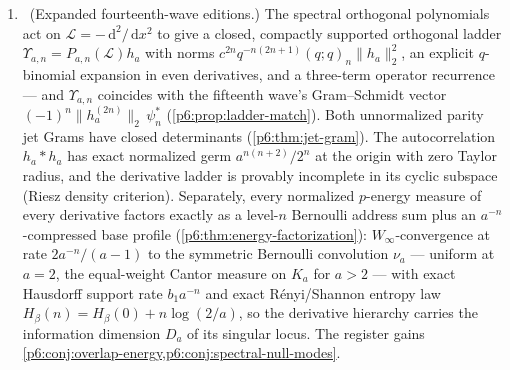 \documentclass[11pt,oneside]{article}
\numberwithin{equation}{section}
\theoremstyle{definition}
\theoremstyle{remark}
\newcommand{\dd}{\,\mathrm d}
\begin{document}
\begin{enumerate}
\item \newflag\ (Expanded fourteenth-wave editions.)  The spectral
orthogonal polynomials act on $\mathcal L=-\dd^2/\dd x^2$ to give a closed,
compactly supported orthogonal ladder
$\Upsilon_{a,n}=P_{a,n}(\mathcal L)h_a$ with norms
$c^{2n}q^{-n(2n+1)}(q;q)_n\|h_a\|_2^2$, an explicit $q$-binomial expansion
in even derivatives, and a three-term operator recurrence --- and
$\Upsilon_{a,n}$ coincides with the fifteenth wave's Gram--Schmidt vector
$(-1)^n\|h_a^{(2n)}\|_2\,\psi_n^{\ast}$ (\cref{p6:prop:ladder-match}).
Both unnormalized parity jet Grams have closed determinants
(\cref{p6:thm:jet-gram}).  The autocorrelation $h_a*h_a$ has exact
normalized germ $a^{n(n+2)}/2^n$ at the origin with zero Taylor radius,
and the derivative ladder is provably incomplete in its cyclic subspace
(Riesz density criterion).  Separately, every normalized $p$-energy
measure of every derivative factors exactly as a level-$n$ Bernoulli
address sum plus an $a^{-n}$-compressed base profile
(\cref{p6:thm:energy-factorization}): $W_\infty$-convergence at rate
$2a^{-n}/(a-1)$ to the symmetric Bernoulli convolution $\nu_a$ ---
uniform at $a=2$, the equal-weight Cantor measure on $K_a$ for $a>2$ ---
with exact Hausdorff support rate $b_1a^{-n}$ and exact R\'enyi/Shannon
entropy law $H_\beta(n)=H_\beta(0)+n\log(2/a)$, so the derivative
hierarchy carries the information dimension $D_a$ of its singular locus.
The register gains
\cref{p6:conj:overlap-energy,p6:conj:spectral-null-modes}.


\end{enumerate}
\end{document}
